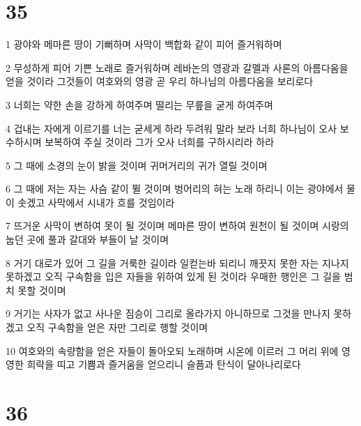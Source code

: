 \chapter{35}

\par 1 광야와 메마른 땅이 기뻐하며 사막이 백합화 같이 피어 즐거워하며
\par 2 무성하게 피어 기쁜 노래로 즐거워하며 레바논의 영광과 갈멜과 사론의 아름다움을 얻을 것이라 그것들이 여호와의 영광 곧 우리 하나님의 아름다움을 보리로다
\par 3 너희는 약한 손을 강하게 하여주며 떨리는 무릎을 굳게 하여주며
\par 4 겁내는 자에게 이르기를 너는 굳세게 하라 두려워 말라 보라 너희 하나님이 오사 보수하시며 보복하여 주실 것이라 그가 오사 너희를 구하시리라 하라
\par 5 그 때에 소경의 눈이 밝을 것이며 귀머거리의 귀가 열릴 것이며
\par 6 그 때에 저는 자는 사슴 같이 뛸 것이며 벙어리의 혀는 노래 하리니 이는 광야에서 물이 솟겠고 사막에서 시내가 흐를 것임이라
\par 7 뜨거운 사막이 변하여 못이 될 것이며 메마른 땅이 변하여 원천이 될 것이며 시랑의 눕던 곳에 풀과 갈대와 부들이 날 것이며
\par 8 거기 대로가 있어 그 길을 거룩한 길이라 일컫는바 되리니 깨끗지 못한 자는 지나지 못하겠고 오직 구속함을 입은 자들을 위하여 있게 된 것이라 우매한 행인은 그 길을 범치 못할 것이며
\par 9 거기는 사자가 없고 사나운 짐승이 그리로 올라가지 아니하므로 그것을 만나지 못하겠고 오직 구속함을 얻은 자만 그리로 행할 것이며
\par 10 여호와의 속량함을 얻은 자들이 돌아오되 노래하며 시온에 이르러 그 머리 위에 영영한 희락을 띠고 기쁨과 즐거움을 얻으리니 슬픔과 탄식이 달아나리로다

\chapter{36}

